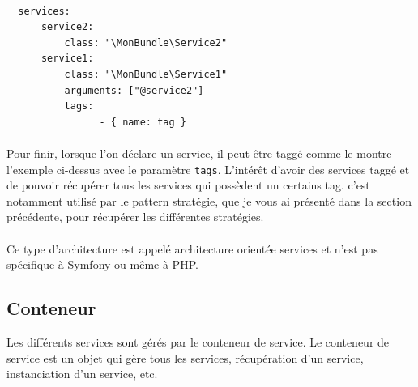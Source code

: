 \begin{verbatim}

  services:
      service2:
          class: "\MonBundle\Service2"
      service1:
          class: "\MonBundle\Service1"
          arguments: ["@service2"]
          tags:
                - { name: tag }

\end{verbatim}
\paragraph{}
Pour finir, lorsque l'on déclare un service, il peut être taggé comme le montre l'exemple ci-dessus avec le paramètre \verb?tags?.
L'intérêt d'avoir des services taggé et de pouvoir récupérer tous les services qui possèdent un certains tag. c'est notamment utilisé par le pattern stratégie, que je vous ai présenté dans la section précédente, pour récupérer les différentes stratégies.
\paragraph{}
Ce type d'architecture est appelé \og architecture orientée services \fg{} et n'est pas spécifique à Symfony ou même à PHP.
\subsection{Conteneur}
Les différents services sont gérés par le conteneur de service. Le conteneur de service est un objet qui gère tous les services, récupération d'un service, instanciation d'un service, etc.
